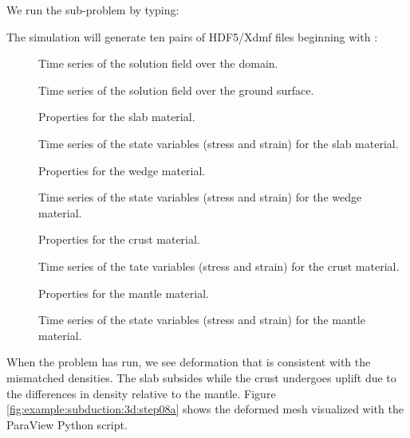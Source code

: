 We run the sub-problem by typing:
The simulation will generate ten pairs of HDF5/Xdmf files beginning
with :
\begin{description}
\item[] Time series of the solution field over the domain.
\item[] Time series of the solution field over the ground surface.
\item[] Properties for
  the slab material.
\item[] Time series of the state variables (stress and strain) for the slab material.
\item[] Properties for
  the wedge material.
\item[] Time series of the state variables (stress and strain) for the wedge material.
\item[] Properties for
  the crust material.
\item[] Time series of the tate variables
  (stress and strain) for the crust material.
\item[] Properties for
  the mantle material.
\item[] Time series of the state variables
  (stress and strain) for the mantle material.
\end{description}

When the problem has run, we see deformation that is consistent with
the mismatched densities. The slab subsides while the crust undergoes
uplift due to the differences in density relative to the mantle. Figure
\ref{fig:example:subduction:3d:step08a} shows the deformed mesh
visualized with the  ParaView Python
script.

